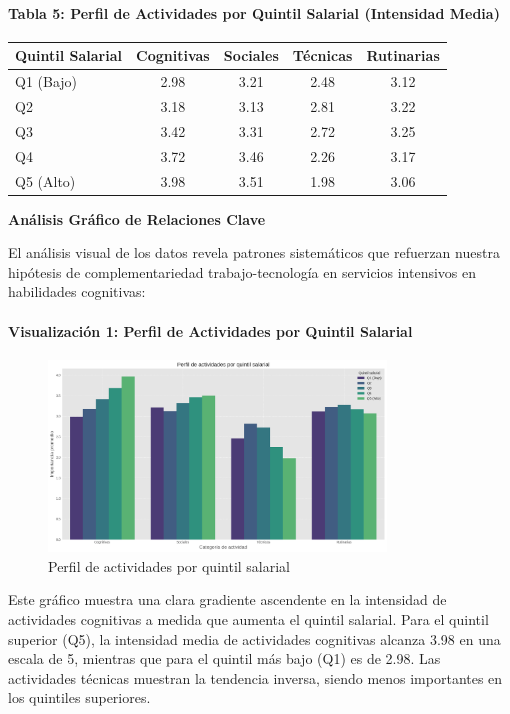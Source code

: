 \documentclass{article}
\theoremstyle{remark}
\theoremstyle{definition}
\begin{document}
\begin{tcolorbox}
\paragraph{Tabla 5: Perfil de Actividades por Quintil Salarial (Intensidad Media)}
\begin{table}[H]
\centering
\begin{tabular}{|l|c|c|c|c|}
\hline
\textbf{Quintil Salarial} & \textbf{Cognitivas} & \textbf{Sociales} & \textbf{Técnicas} & \textbf{Rutinarias} \\
\hline
Q1 (Bajo) & 2.98 & 3.21 & 2.48 & 3.12 \\
Q2 & 3.18 & 3.13 & 2.81 & 3.22 \\
Q3 & 3.42 & 3.31 & 2.72 & 3.25 \\
Q4 & 3.72 & 3.46 & 2.26 & 3.17 \\
Q5 (Alto) & 3.98 & 3.51 & 1.98 & 3.06 \\
\hline
\end{tabular}
\end{table}

\textbf{Análisis Gráfico de Relaciones Clave}

El análisis visual de los datos revela patrones sistemáticos que refuerzan nuestra hipótesis de complementariedad trabajo-tecnología en servicios intensivos en habilidades cognitivas:

\paragraph{Visualización 1: Perfil de Actividades por Quintil Salarial}
\begin{figure}[H]
    \centering
    \includegraphics[width=0.8\textwidth]{views/entrega1/perfil_quintil_salarial.png}
    \caption{Perfil de actividades por quintil salarial}
    \label{fig:perfil_quintil}
\end{figure}

Este gráfico muestra una clara gradiente ascendente en la intensidad de actividades cognitivas a medida que aumenta el quintil salarial. Para el quintil superior (Q5), la intensidad media de actividades cognitivas alcanza 3.98 en una escala de 5, mientras que para el quintil más bajo (Q1) es de 2.98. Las actividades técnicas muestran la tendencia inversa, siendo menos importantes en los quintiles superiores.


\end{tcolorbox}
\end{document}
